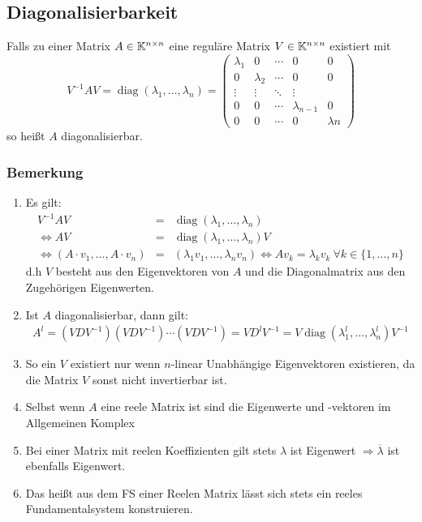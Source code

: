 \subsection{Diagonalisierbarkeit}
Falls zu einer Matrix $A \in \mathbb{K}^{n \times n}$ eine reguläre Matrix $V \in \mathbb{K}^{n \times n}$ existiert mit
\begin{equation*}
	V^{-1} A V = \operatorname{diag}(\lambda_1, \ldots, \lambda_n) = 
	\begin{pmatrix}
		\lambda_1 & 0 & \cdots & 0 & 0 \\
		0 & \lambda_2 & \cdots & 0 & 0 \\
		\vdots & \vdots & \ddots & \vdots \\
		0 & 0 & \cdots & \lambda_{n-1} & 0\\
		0 & 0 & \cdots & 0 & \lambda{n}
	\end{pmatrix}
\end{equation*}
so heißt $A$ diagonalisierbar.

\subsubsection{Bemerkung}
\begin{enumerate}[label= (\alph*)]
	\item Es gilt:
		\begin{eqnarray*}
			V^{-1} A V &=& \operatorname{diag}(\lambda_1, \ldots, \lambda_n)\\
			\Leftrightarrow A V &=& \operatorname{diag}(\lambda_1, \ldots, \lambda_n) V \\
			\Leftrightarrow (A  \cdot v_1, \ldots, A \cdot v_n) &=& (\lambda_1 v_1, \ldots, \lambda_n v_n)
			\Leftrightarrow A v_k = \lambda_k v_k\ \forall k \in \{1, \ldots, n\}
		\end{eqnarray*}
		d.h $V$ besteht aus den Eigenvektoren von $A$ und die Diagonalmatrix aus den Zugehörigen Eigenwerten.
	\item Ist $A$ diagonalisierbar, dann gilt:
		\begin{eqnarray*}
			A^l = (V D V^{-1}) (V D V^{-1}) \cdots (V D V^{-1}) = V D^l V^{-1} = V 
			\operatorname{diag}(\lambda_1^l, \ldots, \lambda_n^l) V^{-1}
		\end{eqnarray*}
	\item So ein $V$ existiert nur wenn $n$-linear Unabhängige Eigenvektoren existieren, da die Matrix $V$ sonst nicht
		invertierbar ist.
	\item Selbst wenn $A$ eine reele Matrix ist sind die Eigenwerte und -vektoren im Allgemeinen Komplex
	\item Bei einer Matrix mit reelen Koeffizienten gilt stets $\lambda$ ist Eigenwert $\Rightarrow \overline{\lambda}$
		ist ebenfalls Eigenwert.
	\item Das heißt aus dem FS einer Reelen Matrix lässt sich stets ein reeles Fundamentalsystem konstruieren.
\end{enumerate}


